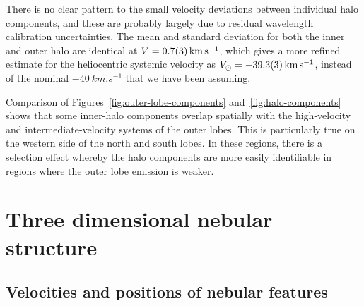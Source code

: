 \documentclass[useAMS, usenatbib]{mnras}
\begin{document}
There is no clear pattern to the small velocity deviations between individual halo components,
and these are probably largely due to residual wavelength calibration uncertainties.
The mean and standard deviation for both the inner and outer halo are identical at \(V = \SI{+0.7 \pm 0.3}{km.s^{-1}}\),
which gives a more refined estimate for the heliocentric systemic velocity as
\(V_\odot = \SI{-39.3 \pm 0.3}{km.s^{-1}} \),
instead of the nominal \(\SI{-40}{km.s^{-1}}\) that we have been assuming.

Comparison of Figures~\ref{fig:outer-lobe-components} and~\ref{fig:halo-components}
shows that some inner-halo components overlap spatially with the high-velocity and intermediate-velocity systems of the outer lobes.
This is particularly true on the western side of the north and south lobes.
In these regions, there is a selection effect whereby
the halo components are more easily identifiable in regions where the outer lobe emission is weaker. 

\section{Three dimensional nebular structure}
\label{sec:three-dimens-struct}


\subsection{Velocities and positions of nebular features}
\label{sec:veloc-posit-three}
\end{document}
